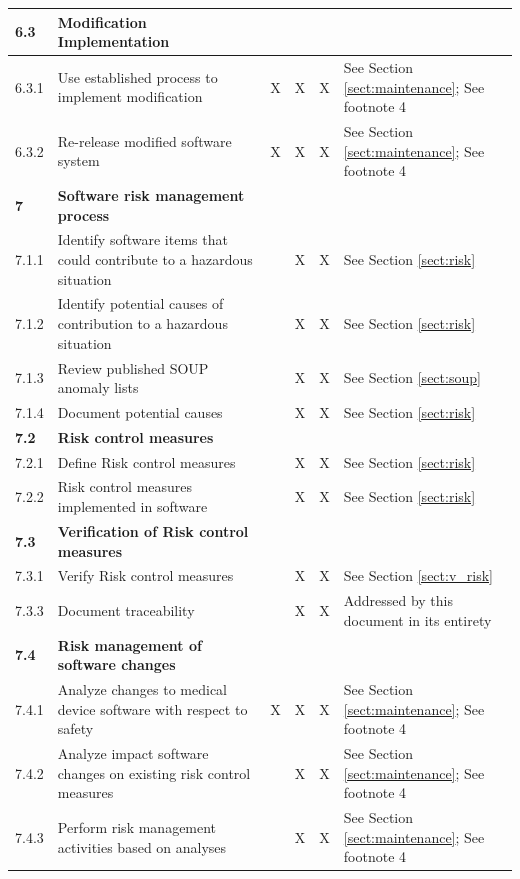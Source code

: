 \documentclass[]{article}
\begin{document}
\begin{center}
\begin{longtable}{ |p{1.3cm}| p{5.5cm}| p{0.7cm}| p{0.7cm}| p{0.7cm}| p{3.5cm}| }
	
	\rowcolor{blue!25} \textbf{6.3} & \textbf{Modification Implementation}  &  &  &  &  \\ \hline
	6.3.1 & Use established process to implement modification  & X & X & X & See Section \ref{sect:maintenance}; See footnote 4  \\ \hline
	6.3.2 & Re-release modified software system  & X & X & X & See Section \ref{sect:maintenance}; See footnote 4 \\ \hline
	
	
	\rowcolor{blue!25} \textbf{7} & \textbf{Software risk management process}  &  &  &  &  \\ \hline
	7.1.1 & Identify software items that could contribute to a hazardous situation &  & X & X & See Section \ref{sect:risk} \\ \hline
	7.1.2 & Identify potential causes of contribution to a hazardous situation &  & X & X & See Section \ref{sect:risk} \\ \hline
	7.1.3 & Review published SOUP anomaly lists  &  & X & X & See Section \ref{sect:soup} \\ \hline
	7.1.4 & Document potential causes &  & X & X &See Section \ref{sect:risk} \\ \hline
	
	
	\rowcolor{blue!25} \textbf{7.2} & \textbf{Risk control measures} &  &  &  &  \\ \hline
	7.2.1 & Define Risk control measures &  & X & X & See Section \ref{sect:risk} \\ \hline
	7.2.2 & Risk control measures implemented in software &  & X & X & See Section \ref{sect:risk} \\ \hline
	
	
	\rowcolor{blue!25} \textbf{7.3} & \textbf{Verification of Risk control measures} &  &  &  &  \\ \hline
	7.3.1 & Verify Risk control measures  &  & X & X & See Section \ref{sect:v_risk} \\ \hline
	7.3.3 & Document traceability &  & X & X & Addressed by this document in its entirety \\ \hline
	
	
	\rowcolor{blue!25} \textbf{7.4} & \textbf{Risk management of software changes} &  &  &  &  \\ \hline
	7.4.1 & Analyze changes to medical device software with respect to safety & X & X & X & See Section \ref{sect:maintenance}; See footnote 4 \\ \hline
	7.4.2 & Analyze impact software changes on existing risk control measures &  & X & X & See Section \ref{sect:maintenance}; See footnote 4 \\ \hline
	7.4.3 & Perform risk management activities based on analyses &  & X & X & See Section \ref{sect:maintenance}; See footnote 4 \\ \hline
	

\end{longtable}
\end{center}
\end{document}
